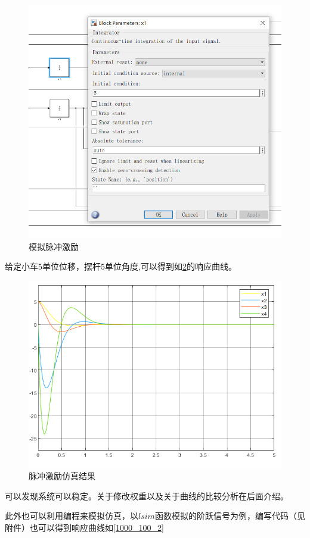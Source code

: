 \documentclass{MathorCupmodeling}
\begin{document}
\begin{figure}[hbpt]
\centering
\includegraphics[width=12cm]{initial.png}
\caption{模拟脉冲激励}\label{initial}
\end{figure}

给定小车$5$单位位移，摆杆$5$单位角度,可以得到如\cref{1000_100}的响应曲线。

\begin{figure}[hbpt]
\centering
\includegraphics[width=12cm]{1000_100.png}
\caption{脉冲激励仿真结果}\label{1000_100}
\end{figure}

可以发现系统可以稳定。关于修改权重以及关于曲线的比较分析在后面介绍。

此外也可以利用编程来模拟仿真，以$lsim$函数模拟的阶跃信号为例，编写代码（见附件）也可以得到响应曲线如\cref{1000_100_2}
\end{document}
